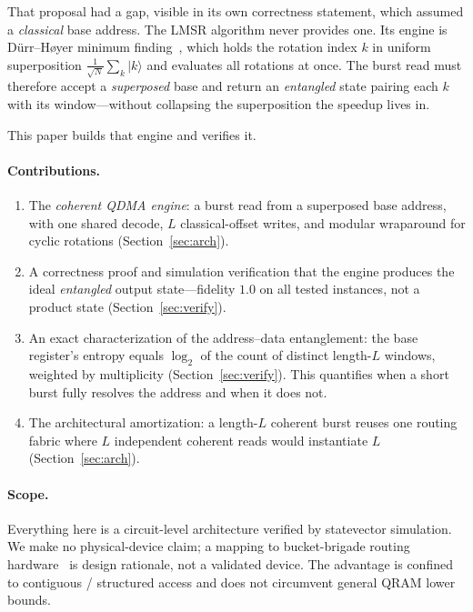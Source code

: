 \documentclass[11pt]{article}
\theoremstyle{definition}
\begin{document}
That proposal had a gap, visible in its own correctness statement, which assumed a
\emph{classical} base address. The LMSR algorithm never provides one. Its engine is
D\"urr--H\o yer minimum finding~\cite{durr1996minimum,grover1996fast}, which holds
the rotation index $k$ in uniform superposition $\tfrac{1}{\sqrt N}\sum_k\lvert
k\rangle$ and evaluates all rotations at once. The burst read must therefore accept
a \emph{superposed} base and return an \emph{entangled} state pairing each $k$ with
its window---without collapsing the superposition the speedup lives in.

This paper builds that engine and verifies it.

\paragraph{Contributions.}
\begin{enumerate}
  \item The \emph{coherent QDMA engine}: a burst read from a superposed base
  address, with one shared decode, $L$ classical-offset writes, and modular
  wraparound for cyclic rotations (Section~\ref{sec:arch}).
  \item A correctness proof and simulation verification that the engine produces
  the ideal \emph{entangled} output state---fidelity $1.0$ on all tested
  instances, not a product state (Section~\ref{sec:verify}).
  \item An exact characterization of the address--data entanglement: the base
  register's entropy equals $\log_2$ of the count of distinct length-$L$ windows,
  weighted by multiplicity (Section~\ref{sec:verify}). This quantifies when a
  short burst fully resolves the address and when it does not.
  \item The architectural amortization: a length-$L$ coherent burst reuses one
  routing fabric where $L$ independent coherent reads would instantiate $L$
  (Section~\ref{sec:arch}).
\end{enumerate}

\paragraph{Scope.} Everything here is a circuit-level architecture verified by
statevector simulation. We make no physical-device claim; a mapping to
bucket-brigade routing hardware~\cite{giovannetti2008architectures} is design
rationale, not a validated device. The advantage is confined to contiguous /
structured access and does not circumvent general QRAM lower bounds.
\end{document}
